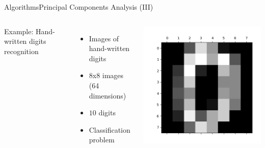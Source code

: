 \documentclass[10pt,compress]{beamer} %
\begin{document}
\begin{frame}{Algorithms}{Principal Components Analysis (III)}
	\vspace{-0.5cm}
    \begin{columns}
		Example: Hand-written digits recognition
		\begin{itemize}
			\item Images of hand-written digits
			\item 8x8 images (64 dimensions)
			\item $10$ digits
			\item Classification problem
		\end{itemize}
			\includegraphics[width=\linewidth]{figs/zero.png}
    \end{columns}


\end{frame}
\end{document}
